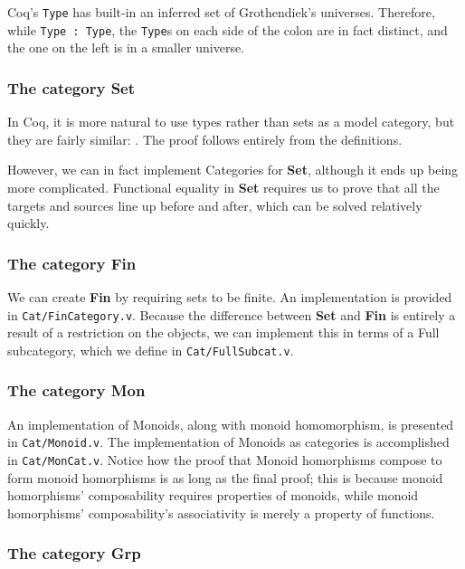 \documentclass[12pt,twocolumn,oneside]{book}
\begin{document}
Coq's \texttt{Type} has built-in an inferred set of Grothendiek's universes. Therefore,
while \texttt{Type : Type}, the \texttt{Type}s on each side of the colon are in fact
distinct, and the one on the left is in a smaller universe.

\subsubsection{The category \textbf{Set}}

In Coq, it is more natural to use types rather than sets as a model category, but
they are fairly similar: . The proof follows entirely
from the definitions.

However, we can in fact implement Categories for \textbf{Set}, although it ends
up being more complicated. Functional equality in \textbf{Set} requires us to prove
that all the targets and sources line up before and after, which can be solved relatively
quickly.

\subsubsection{The category \textbf{Fin}}

We can create \textbf{Fin} by requiring sets to be finite. An implementation is
provided in \texttt{Cat/FinCategory.v}. Because the difference between \textbf{Set}
and \textbf{Fin} is entirely a result of a restriction on the objects, we can implement
this in terms of a Full subcategory, which we define in \texttt{Cat/FullSubcat.v}.

\subsubsection{The category \textbf{Mon}}

An implementation of Monoids, along with monoid homomorphism, is presented in
\texttt{Cat/Monoid.v}. The implementation of Monoids as categories is accomplished
in \texttt{Cat/MonCat.v}. Notice how the proof that Monoid homorphisms compose to form
monoid homorphisms is as long as the final proof; this is because monoid homorphisms'
composability requires properties of monoids, while monoid homorphisms' composability's
associativity is merely a property of functions.

\subsubsection{The category \textbf{Grp}}
\end{document}
